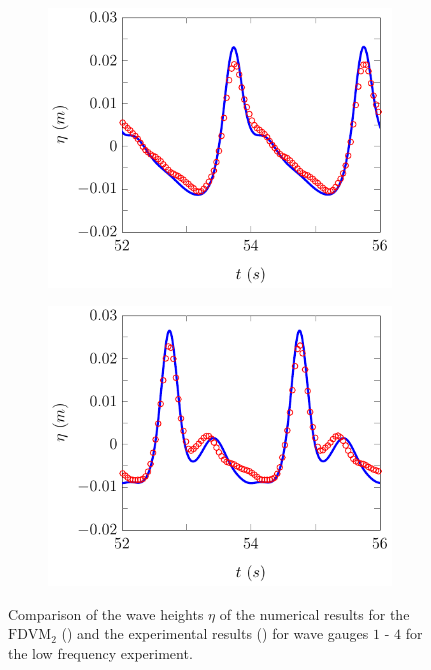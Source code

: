\begin{figure}
\begin{subfigure}{0.5\textwidth}
	\end{subfigure}
	\begin{subfigure}{0.5\textwidth}
		\includegraphics[width=\textwidth]{./chp6/figures/Experiment/Beji/sl/FDVMWG3.pdf}
		\vspace{0.5cm}
	\end{subfigure}%
	\begin{subfigure}{0.5\textwidth}
		\includegraphics[width=\textwidth]{./chp6/figures/Experiment/Beji/sl/FDVMWG4.pdf}
		\vspace{0.5cm}
	\end{subfigure}
	\caption{Comparison of the wave heights $\eta$ of the numerical results for the $\text{FDVM}_2$ ({\color{blue}\solidrule}) and the experimental results () for wave gauges $1$ - $4$ for the low frequency experiment.}
	\label{fig:BejislWG1to4FDVM}
\end{figure}

